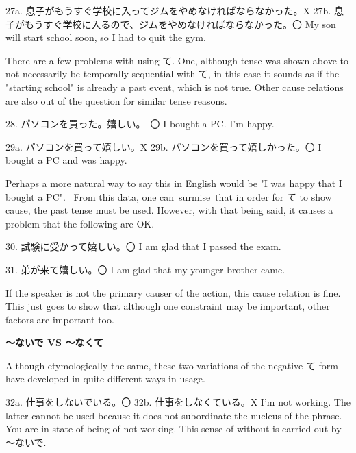 \par{27a. 息子がもうすぐ学校に入ってジムをやめなければならなかった。X \hfill\break
27b. 息子がもうすぐ学校に入るので、ジムをやめなければならなかった。〇 \hfill\break
My son will start school soon, so I had to quit the gym. }

\par{ There are a few problems with using て. One, although tense was shown above to not necessarily be temporally sequential with て, in this case it sounds as if the "starting school" is already a past event, which is not true. Other cause relations are also out of the question for similar tense reasons. }

\par{28. パソコンを買った。嬉しい。　〇 \hfill\break
I bought a PC. I'm happy. }

\par{29a. パソコンを買って嬉しい。X \hfill\break
29b. パソコンを買って嬉しかった。〇 \hfill\break
I bought a PC and was happy. }

\par{ Perhaps a more natural way to say this in English would be "I was happy that I bought a PC".  From this data, one can surmise that in order for て to show cause, the past tense must be used. However, with that being said, it causes a problem that the following are OK. }

\par{30. 試験に受かって嬉しい。〇 \hfill\break
I am glad that I passed the exam. }

\par{31. 弟が来て嬉しい。〇 \hfill\break
I am glad that my younger brother came. }

\par{  If the speaker is not the primary causer of the action, this cause relation is fine. This just goes to show that although one constraint may be important, other factors are important too. }

\begin{center}
\textbf{～ないで VS ～なくて }
\end{center}

\par{  Although etymologically the same, these two variations of the negative て form have developed in quite different ways in usage. }

\par{32a. 仕事をしないでいる。〇 \hfill\break
32b. 仕事をしなくている。X \hfill\break
I'm not working. \hfill\break
\hfill\break
 The latter cannot be used because it does not subordinate the nucleus of the phrase. You are in state of being of not working. This sense of without is carried out by ～ないで. }

